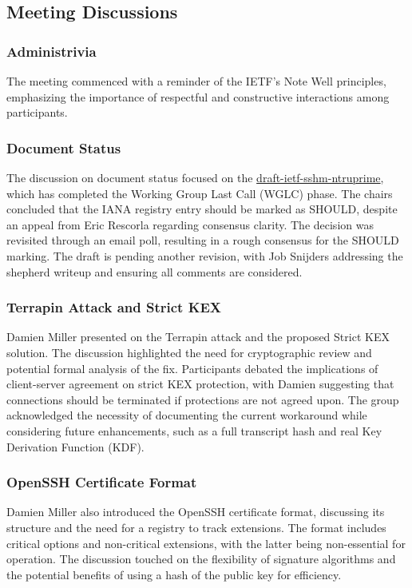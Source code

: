 \documentclass{article}
\begin{document}
\subsection{Meeting Discussions}

\subsubsection{Administrivia}
The meeting commenced with a reminder of the IETF's Note Well principles, emphasizing the importance of respectful and constructive interactions among participants.

\subsubsection{Document Status}
The discussion on document status focused on the \href{https://datatracker.ietf.org/doc/html/draft-ietf-sshm-ntruprime}{draft-ietf-sshm-ntruprime}, which has completed the Working Group Last Call (WGLC) phase. The chairs concluded that the IANA registry entry should be marked as SHOULD, despite an appeal from Eric Rescorla regarding consensus clarity. The decision was revisited through an email poll, resulting in a rough consensus for the SHOULD marking. The draft is pending another revision, with Job Snijders addressing the shepherd writeup and ensuring all comments are considered.

\subsubsection{Terrapin Attack and Strict KEX}
Damien Miller presented on the Terrapin attack and the proposed Strict KEX solution. The discussion highlighted the need for cryptographic review and potential formal analysis of the fix. Participants debated the implications of client-server agreement on strict KEX protection, with Damien suggesting that connections should be terminated if protections are not agreed upon. The group acknowledged the necessity of documenting the current workaround while considering future enhancements, such as a full transcript hash and real Key Derivation Function (KDF).

\subsubsection{OpenSSH Certificate Format}
Damien Miller also introduced the OpenSSH certificate format, discussing its structure and the need for a registry to track extensions. The format includes critical options and non-critical extensions, with the latter being non-essential for operation. The discussion touched on the flexibility of signature algorithms and the potential benefits of using a hash of the public key for efficiency.
\end{document}
